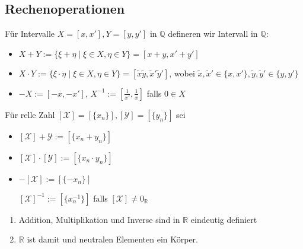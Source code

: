 \subsection*{Rechenoperationen}
\begin{definition}
	Für Intervalle $X=[x,x'], Y=[y,y']$ in $\mathbb{Q}$ defineren wir Intervall in $\mathbb{Q}$:
	\begin{itemize}
		\item $X + Y := \{\xi + \eta \mid \xi \in X, \eta\in Y\} = [x + y, x' + y']$
		\item $X\cdot Y :=\{\xi \cdot \eta \mid \xi \in X, \eta\in Y\} = [\tilde{x}\tilde{y}, \tilde{x}'\tilde{y}']$, wobei $\tilde{x},\tilde{x}'\in\{x,x'\},\tilde{y},\tilde{y}'\in\{y,y'\}$
		\item $-X := [-x,-x']$, $X^{-1}:=[\frac{1}{x'}, \frac{1}{x}]$ falls $0\in X$
	\end{itemize}

	Für relle Zahl $[\mathcal{X}] = [\{x_n\}], [\mathcal{Y}]=[\{y_n\}]$ sei
	\begin{itemize}
		\item $[\mathcal{X}]+\mathcal{Y} :=[\{x_n + y_n\}]$
		\item $[\mathcal{X}]\cdot[\mathcal{Y}] :=[\{x_n\cdot y_n\}]$
		\item $-[\mathcal{X}]:=[\{-x_n\}]$
			
			$[\mathcal{X}]^{-1} := [\{x_n^{-1}\}]$ falls $[\mathcal{X}]\neq 0_\mathbb{R}$
	\end{itemize}
\end{definition}

\begin{proposition}
	\begin{enumerate}[label={\arabic*)}]
		\item Addition, Multiplikation und Inverse sind in $\mathbb{R}$ eindeutig definiert
		\item $\mathbb{R}$ ist damit und neutralen Elementen ein Körper.
	\end{enumerate}
\end{proposition}

